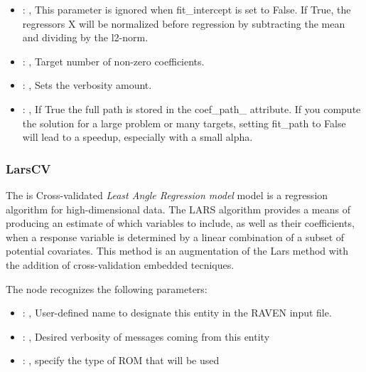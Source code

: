 \begin{itemize}
    \item {}: , 
      This parameter is ignored when fit\_intercept is set to False. If True,
      the regressors X will be normalized before regression by subtracting the mean and
      dividing by the l2-norm.

    \item {}: , 
      Target number of non-zero coefficients.

    \item {}: , 
      Sets the verbosity amount.

    \item {}: , 
      If True the full path is stored in the coef\_path\_ attribute.
      If you compute the solution for a large problem or many targets,
      setting fit\_path to False will lead to a speedup, especially with a
      small alpha.
  \end{itemize}


\subsubsection{LarsCV}
  The  is Cross-validated \textit{Least Angle Regression model} model
  is a regression algorithm for high-dimensional data.                         The LARS algorithm
  provides a means of producing an estimate of which variables                         to include,
  as well as their coefficients, when a response variable is                         determined by a
  linear combination of a subset of potential covariates.                         This method is an
  augmentation of the Lars method with the addition of cross-validation
  embedded tecniques.                         

  The  node recognizes the following parameters:
    \begin{itemize}
      \item {}: , 
        User-defined name to designate this entity in the RAVEN input file.
      \item {}: , 
        Desired verbosity of messages coming from this entity
      \item {}: , 
        specify the type of ROM that will be used
  \end{itemize}

